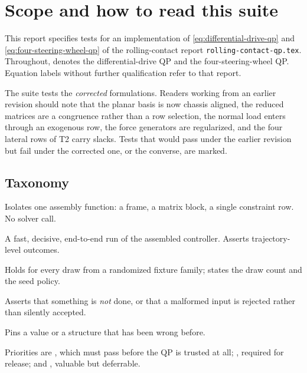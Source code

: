\documentclass[10pt]{article}
\author{
  Yuquan WANG \\
  Tencent Robotics X \\
  Shenzhen, P.R. China\\
  \vspace{5pt}
  \texttt{hasbragwang@tencent.com}\vspace{30pt} \\
}
\newcommand{\parentDoc}{\texttt{rolling-contact-qp.tex}\xspace}
\begin{document}
\maketitle

\section{Scope and how to read this suite}
\label{sec:test-scope}

This report specifies tests for an implementation of
\eqref{eq:differential-drive-qp} and \eqref{eq:four-steering-wheel-qp} of the
rolling-contact report \parentDoc. Throughout,  denotes the
differential-drive QP and  the four-steering-wheel QP. Equation
labels without further qualification refer to that report.

The suite tests the \emph{corrected} formulations. Readers working from an
earlier revision should note that the planar basis is now chassis aligned, the
reduced matrices are a congruence rather than a row selection, the normal load
enters through an exogenous row, the force generators are regularized, and the
four lateral rows of T2 carry slacks. Tests that would pass under the earlier
revision but fail under the corrected one, or the converse, are marked.

\subsection{Taxonomy}

\begin{description}[leftmargin=6.5em,style=sameline,itemsep=2pt]
  \item[unit] Isolates one assembly function: a frame, a
    matrix block, a single constraint row. No solver call.
  \item[smoke] A fast, decisive, end-to-end run of the
    assembled controller. Asserts trajectory-level outcomes.
  \item[property] Holds for every draw from a randomized
    fixture family; states the draw count and the seed policy.
  \item[negative] Asserts that something is \emph{not}
    done, or that a malformed input is rejected rather than silently accepted.
  \item[regression] Pins a value or a structure that has
    been wrong before.
\end{description}

Priorities are , which must pass before the QP is trusted at all;
, required for release; and , valuable but deferrable.
\end{document}

